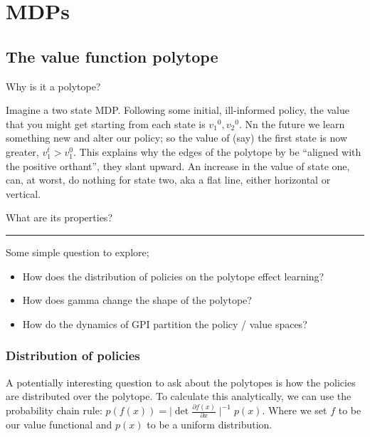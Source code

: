 \chapter{MDPs}

\section{The value function polytope}

Why is it a polytope?

Imagine a two state MDP. Following some initial, ill-informed policy,
the value that you might get starting from each state is
${v_1}^0, {v_2}^0$. Nn the future we learn something new and alter our
policy; so the value of (say) the first state is now greater,
\(v_1^t > v_1^0\). This explains why the edges of the polytope by be
``aligned with the positive orthant'', they slant upward. An increase in
the value of state one, can, at worst, do nothing for state two, aka a
flat line, either horizontal or vertical.

What are its properties?

\begin{center}\rule{0.5\linewidth}{\linethickness}\end{center}

Some simple question to explore;

\begin{itemize}
\item
  How does the distribution of policies on the polytope effect learning?
\item
  How does gamma change the shape of the polytope?
\item
  How do the dynamics of GPI partition the policy / value spaces?
\end{itemize}

\subsection{Distribution of policies}

A potentially interesting question to ask about the polytopes is how the
policies are distributed over the polytope. To calculate this
analytically, we can use the probability chain rule:
\(p(f(x)) = \mid \det\frac{\partial f(x)}{\partial x}\mid^{-1}p(x)\).
Where we set \(f\) to be our value functional and \(p(x)\) to be a
uniform distribution.

